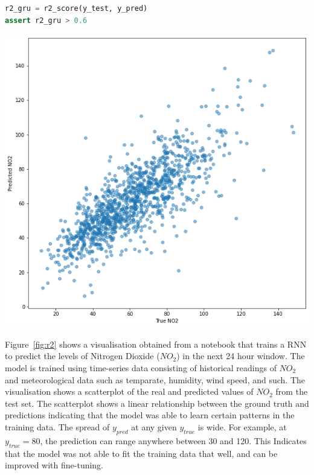 \documentclass[acmsmall,screen,review,anonymous]{acmart}
\begin{document}
\begin{minipage}{0.45\textwidth}
  \begin{lstlisting}[language=Python]
r2_gru = r2_score(y_test, y_pred)
assert r2_gru > 0.6
  \end{lstlisting}
  \label{lst:r2}
\end{minipage}
\hfill
\begin{minipage}{0.45\textwidth}
  \includegraphics[width=\linewidth]{../catalogue/select-332a.png}
  \label{fig:r2}
\end{minipage}

Figure~\ref{fig:r2} shows a visualisation obtained from a notebook that trains a RNN to predict the levels of Nitrogen Dioxide ($NO_2$) in the next 24 hour window. The model is trained using time-series data consisting of historical readings of $NO_2$ and meteorological data such as temparate, humidity, wind speed, and such. The visualisation shows a scatterplot of the real and predicted values of $NO_2$ from the test set. The scatterplot shows a linear relationship between the ground truth and predictions indicating that the model was able to learn certain patterns in the training data. The spread of $y_{pred}$ at any given $y_{true}$ is wide. For example, at $y_{true} = 80$, the prediction can range anywhere between 30 and 120. This Indicates that the model was not able to fit the training data that well, and can be improved with fine-tuning.
\end{document}
